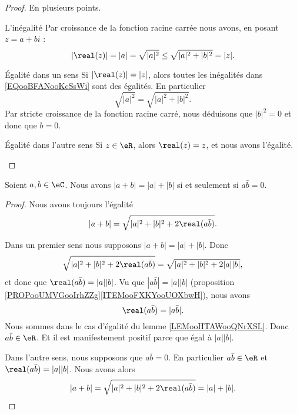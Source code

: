 \begin{proof}
    En plusieurs points.
    \begin{subproof}
    \item[L'inégalité]
        Par croissance de la fonction racine carrée nous avons, en posant \( z=a+bi\) :
        \begin{equation}        \label{EQooBFANooKcSsWi}
            | \real(z) |=| a |=\sqrt{ | a |^2 }\leq \sqrt{ | a |^2+| b |^2 }=| z |.
        \end{equation}
    \item[Égalité dans un sens]
        Si \( | \real(z) |=| z |\), alors toutes les inégalités dans \eqref{EQooBFANooKcSsWi} sont des égalités. En particulier
        \begin{equation}
            \sqrt{ | a |^2 }=\sqrt{ | a |^2+| b |^2 }.
        \end{equation}
        Par stricte croissance de la fonction racine carré, nous déduisons que \( | b |^2=0\) et donc que \( b=0\).
    \item[Égalité dans l'autre sens]
        Si \( z\in \eR\), alors \( \real(z)=z\), et nous avons l'égalité.
    \end{subproof}
\end{proof}

\begin{lemma}       \label{LEMooHWLXooSkUrGg}
    Soient \( a,b\in \eC\). Nous avons \( | a+b |=| a |+| b |\) si et seulement si \( a\bar b=0\).
\end{lemma}

\begin{proof}
    Nous avons toujours l'égalité
    \begin{equation}
        | a+b |=\sqrt{ | a |^2+| b |^2+2\real(a\bar b) }.
    \end{equation}

    Dans un premier sens nous supposons \( | a+b |=| a |+| b |\). Donc 
    \begin{equation}
        \sqrt{ | a |^2+| b |^2+2\real(a\bar b) }=\sqrt{ | a |^2+| b |^2+2| a | |b | },
    \end{equation}
    et donc que \( \real(a\bar b)=| a | |b |\). Vu que \( | a\bar b |=| a | |b |\) (proposition \ref{PROPooUMVGooIrhZZg}\ref{ITEMooFXKYooUOXbwH}), nous avons
    \begin{equation}
        \real(a\bar b)=| a\bar b |.
    \end{equation}
    Nous sommes dans le cas d'égalité du lemme \ref{LEMooHTAWooQNrXSL}. Donc \( a\bar b\in \eR\). Et il est manifestement positif parce que égal à \( | a | |b |\).

     Dans l'autre sens, nous supposons que \( a\bar b=0\). En particulier \( a\bar b\in \eR\) et \( \real(a\bar b)=| a | |b |\). Nous avons alors
    \begin{equation}
        | a+b |=\sqrt{ | a |^2+| b |^2+2\real(a\bar b) }=| a |+| b |.
    \end{equation}
\end{proof}

